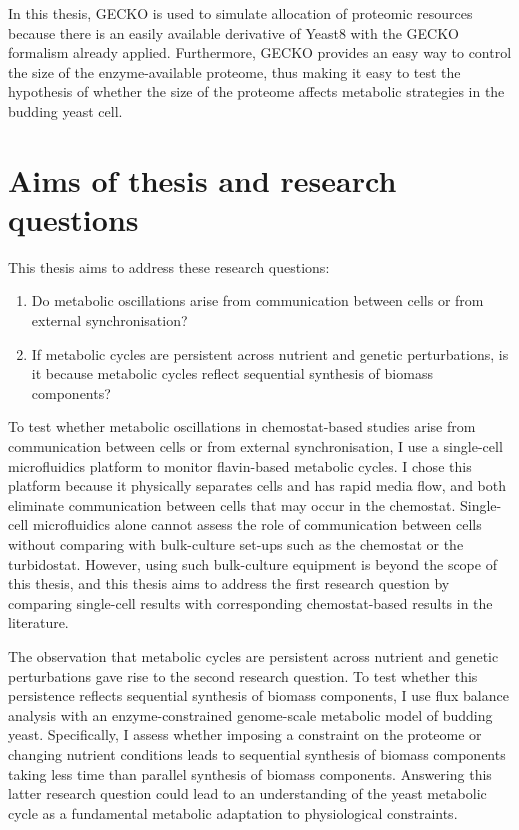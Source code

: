 In this thesis, GECKO is used to simulate allocation of proteomic resources because there is an easily available derivative of Yeast8 with the GECKO formalism already applied.
Furthermore, GECKO provides an easy way to control the size of the enzyme-available proteome, thus making it easy to test the hypothesis of whether the size of the proteome affects metabolic strategies in the budding yeast cell.

\pagebreak

\section{Aims of thesis and research questions}
\label{sec:intro-aims}

This thesis aims to address these research questions:
\begin{enumerate}
  \item Do metabolic oscillations arise from communication between cells or from external synchronisation?
  \item If metabolic cycles are persistent across nutrient and genetic perturbations, is it because metabolic cycles reflect sequential synthesis of biomass components?
\end{enumerate}

To test whether metabolic oscillations in chemostat-based studies arise from communication between cells or from external synchronisation, I use a single-cell microfluidics platform to monitor flavin-based metabolic cycles.
I chose this platform because it physically separates cells and has rapid media flow, and both eliminate communication between cells that may occur in the chemostat.
Single-cell microfluidics alone cannot assess the role of communication between cells without comparing with bulk-culture set-ups such as the chemostat or the turbidostat.
However, using such bulk-culture equipment is beyond the scope of this thesis, and this thesis aims to address the first research question by comparing single-cell results with corresponding chemostat-based results in the literature.

The observation that metabolic cycles are persistent across nutrient and genetic perturbations gave rise to the second research question.
To test whether this persistence reflects sequential synthesis of biomass components, I use flux balance analysis with an enzyme-constrained genome-scale metabolic model of budding yeast.
Specifically, I assess whether imposing a constraint on the proteome or changing nutrient conditions leads to sequential synthesis of biomass components taking less time than parallel synthesis of biomass components.
Answering this latter research question could lead to an understanding of the yeast metabolic cycle as a fundamental metabolic adaptation to physiological constraints.

